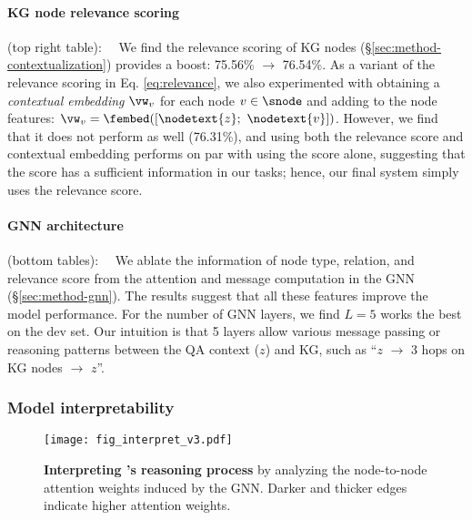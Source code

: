 \paragraph{KG node relevance scoring}\!\!\!\!(top right table):~~
We find the relevance scoring of KG nodes (\S \ref{sec:method-contextualization}) provides a boost: 75.56\% $\!\rightarrow\!$ 76.54\%.
As a variant of the relevance scoring in Eq.\! \ref{eq:relevance}, we also experimented with obtaining a \emph{contextual embedding} $\vw_v$ for each node $v\in\snode$ and adding to the node features:
$
\vw_v=\fembed([\nodetext{z};~ \nodetext{v}])
$.
However, we find that it does not perform as well (76.31\%), and
using both the relevance score and contextual embedding performs on par with using the score alone, suggesting that the score has a sufficient information in our tasks; hence, our final system simply uses the relevance score.



\paragraph{GNN architecture}\!\!\!\!(bottom tables):~~ We ablate the information of node type, relation, and relevance score from the attention and message computation in the GNN (\S \ref{sec:method-gnn}). The results suggest that all these features improve the model performance. 
For the number of GNN layers, we find $L=5$ works the best on the dev set. Our intuition is that 5 layers allow various message passing or reasoning patterns between the QA context ($z$) and KG, such as ``$z$ $\!\rightarrow\!$ 3 hops on KG nodes $\!\rightarrow\!$ $z$''.


\subsubsection{Model interpretability}
\begin{figure}[!t]
\hspace{-1mm}
    \centering \texttt{[image: fig\_interpret\_v3.pdf]}
\caption{\textbf{Interpreting \methodname's reasoning process} by analyzing the node-to-node attention weights induced by the GNN. Darker and thicker edges indicate higher attention weights.
    }
\label{fig:interpret}
\end{figure}

